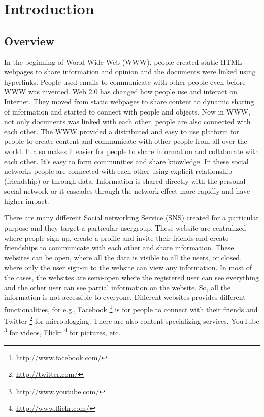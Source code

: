 

\chapter{Introduction} \label{Chapter:Introduction}

\section{Overview}

In the beginning of World Wide Web (WWW), people created static HTML webpages to share information and opinion and the documents were linked using hyperlinks. People used emails to communicate with other people even before WWW was invented. Web 2.0 has changed how people use and interact on Internet. They moved from static webpages to share content to dynamic sharing of information and started to connect with people and objects. Now in WWW, not only documents was linked with each other, people are also connected with each other. The WWW provided a distributed and easy to use platform for people to create content and communicate with other people from all over the world. It also makes it easier for people to share information and collaborate with each other. It's easy to form communities and share knowledge. In these social networks people are connected with each other using explicit relationship (friendship) or through data. Information is shared directly with the personal social network or it cascades through the network effect more rapidly and have higher impact.

 
There are many different Social networking Service (SNS) created for a particular purpose and they target a particular usergroup. These website are centralized where people sign up, create a profile and invite their friends and create friendships to communicate with each other and share information. These websites can be open, where all the data is visible to all the users, or closed, where only the user sign-in to the website can view any information. In most of the cases, the websites are semi-open where the registered user can see everything and the other user can see partial information on the website. So, all the information is not accessible to everyone. Different websites provides different functionalities, for e.g., Facebook  \footnote{\url{http://www.facebook.com/}}  is for people to connect with their friends and Twitter  \footnote{\url{http://twitter.com/}} for microblogging. There are also content specializing services, YouTube \footnote{\url{http://www.youtube.com/}} for videos, Flickr \footnote{\url{http://www.flickr.com/}} for pictures, etc. 



